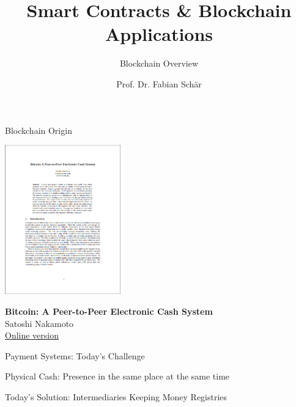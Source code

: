 \documentclass[]{beamer}
\title{Smart Contracts \& Blockchain Applications}
\subtitle{Blockchain Overview}
\author{Prof. Dr. Fabian Schär}
\institute{University of Basel}
\begin{document}
\thispagestyle{empty}
\begin{frame}[noframenumbering]
	\titlepage
\end{frame}

\begin{frame}{Blockchain Origin}

\centering
\includegraphics[width = 5cm, frame]{../assets/images/nakamoto_cover}
		
\textbf{Bitcoin: A Peer-to-Peer Electronic Cash System} \\ 
Satoshi Nakamoto \\
\link \href{https://bitcoin.org/bitcoin.pdf}{Online version}

\end{frame}

\begin{frame}{Payment Systems: Today's Challenge}

Physical Cash: Presence in the same place at the same time
\begin{figure}[h]
	\center
		
\end{figure}

\vspace{1.5 em}

	
\end{frame}


\begin{frame}{Today's Solution: Intermediaries Keeping Money Registries}

\begin{figure}[h]
	\center
		
\end{figure}

	
\end{frame}
\end{document}

